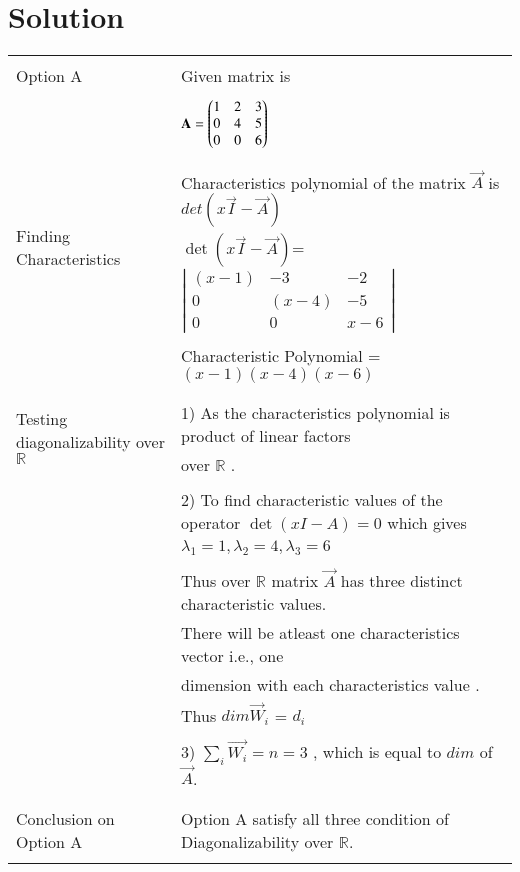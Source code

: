 \documentclass[journal,12pt]{IEEEtran}
\begin{document}
\section{\textbf{Solution}}
\renewcommand{\thetable}{2}
\begin{longtable}{|l|l|}
\hline
\multirow{3}{*}{Option A} & \\
& Given matrix is  \\
&\\
& $\mathbf{A}=\begin{pmatrix}1&2&3\\0&4&5\\0&0&6\end{pmatrix}$\\
&\\
\hline
\multirow{3}{*}{Finding Characteristics} & \\
&
Characteristics polynomial of the matrix $\vec{A}$ is $det(x\vec{I}-\vec{A})$\\ 
polynomial
& $\det(x\vec{I}-\vec{A})$= $\left|
                \begin{array}{ccc}
                (x-1) & -3 & -2\\
                0 & (x-4) & -5\\
                0 & 0 & x-6
                \end{array} \right|$  \\
&\\
& Characteristic Polynomial = $(x-1)(x-4)(x-6)$\\
&\\
\hline
\multirow{3}{*}{Testing diagonalizability over $\mathbb{R}$} & \\
& 1) As the characteristics  polynomial is product of linear factors\\
&over $\mathbb{R}$ .\\
&\\
&2) To find characteristic values of the operator $\det(xI-A) = 0$ which gives  \\
& $\lambda_1= 1 , \lambda_2= 4, \lambda_3= 6$\\
&\\
& Thus over $\mathbb{R}$ matrix $\vec{A}$ has three distinct characteristic values.\\
&There will be atleast one characteristics vector i.e., one\\ & dimension with each characteristics value .\\
&Thus $dim \vec{W}_i$ = $d_i$\\
&\\
&3) $\sum_{i} \vec{W_i} = n = 3$ , which is equal to $dim$ of $\vec{A}$.\\ 
&\\
\hline
\multirow{3}{*}{Conclusion on Option A} & \\
& Option A satisfy all three condition of Diagonalizability over $\mathbb{R}$. \\
&\\


\end{longtable}
\end{document}
